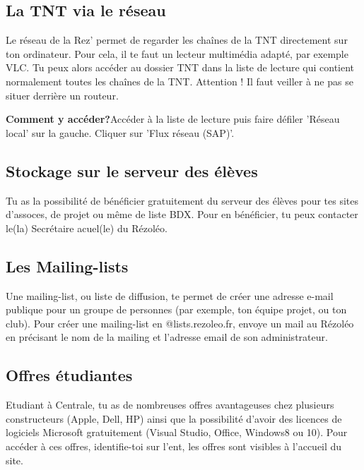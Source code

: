 \documentclass[12pt]{article}
\begin{document}
{  \subsection{La TNT via le réseau}
    Le réseau de la Rez’ permet de regarder les chaînes de la TNT directement sur ton ordinateur. Pour cela, il te faut un lecteur multimédia adapté, par exemple VLC.
    Tu peux alors accéder au dossier TNT dans la liste de lecture qui contient normalement toutes les chaînes de la TNT.
    \newline Attention ! Il faut veiller à ne pas se situer derrière un routeur.
    \begin{description}
      \item \textbf{Comment y accéder?}\newline Accéder à la liste de lecture puis faire défiler 'Réseau local' sur la gauche. Cliquer sur 'Flux réseau (SAP)'.
    \end{description}
  \subsection{Stockage sur le serveur des élèves}
    Tu as la possibilité de bénéficier gratuitement du serveur des élèves pour tes sites d’assoces, de projet ou même de liste BDX. Pour en bénéficier, tu peux contacter le(la) Secrétaire acuel(le) du Rézoléo.
  \subsection{Les Mailing-lists}
    Une mailing-list, ou liste de diffusion, te permet de créer une adresse e-mail publique pour un groupe de personnes (par exemple, ton équipe projet, ou ton club).
    Pour créer une mailing-list en @lists.rezoleo.fr, envoye un mail au Rézoléo en précisant le nom de la mailing et l’adresse email de son administrateur.
  \subsection{Offres étudiantes}
    Etudiant à Centrale, tu as de nombreuses offres avantageuses chez plusieurs constructeurs (Apple, Dell, HP) ainsi que la possibilité d’avoir des licences de logiciels Microsoft gratuitement (Visual Studio, Office, Windows8 ou 10).
    Pour accéder à ces offres, identifie-toi sur l’ent, les offres sont visibles à l'accueil du site.
}
\end{document}
